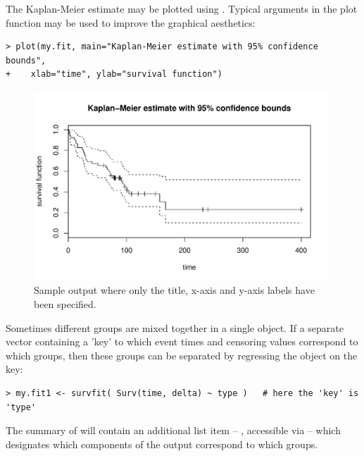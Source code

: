 \documentclass[11pt]{article}
\begin{document}
The Kaplan-Meier estimate may be plotted using . Typical arguments in the plot function may be used to improve the graphical aesthetics:
\begin{verbatim}
> plot(my.fit, main="Kaplan-Meier estimate with 95% confidence bounds",
+    xlab="time", ylab="survival function")
\end{verbatim}
\begin{figure}[htp]
\centering
\includegraphics[height=2.8in]{../figures/kmPlot.pdf} \vspace{-4mm}
\caption{Sample output where only the title, x-axis and y-axis labels have been specified.}
\end{figure}
Sometimes different groups are mixed together in a single  object. If a separate vector containing a 'key' to which event times and censoring values correspond to which groups, then these groups can be separated by regressing the  object on the key:
\begin{verbatim}
> my.fit1 <- survfit( Surv(time, delta) ~ type )   # here the 'key' is 'type'
\end{verbatim}
The summary of  will contain an additional list item -- , accessible via  -- which designates which components of the output correspond to which groups.
\end{document}
